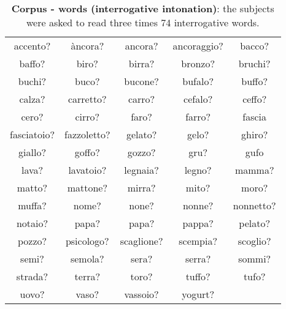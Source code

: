 \begin{table}[htbp]
  \begin{center}
  \begin{scriptsize}
	\begin{tabular}{ccccc}
	  \hline
	  accento?  & \`ancora?  & ancora?  & ancoraggio?  & bacco?\\
	  baffo?  & biro?  & birra?  & bronzo?  & bruchi?\\
	  buchi?  & buco?  & bucone?  & bufalo?  & buffo?\\ 
	  calza?  & carretto?  & carro?  & cefalo?  & ceffo?\\
	  cero?  & cirro?  & faro?  & farro?  & fascia\\
	  fasciatoio?  & fazzoletto?  & gelato?  & gelo?  & ghiro?\\
	  giallo?  & goffo?  & gozzo?  & gru?  & gufo\\
	  lava?  & lavatoio?  & legnaia?  & legno?  & mamma?\\
	  matto?  & mattone?  & mirra?  & mito?  & moro?\\
	  muffa?  & nome?  & none?  & nonne?  & nonnetto?\\
	  notaio?  & papa?  & papa?  & pappa?  & pelato?\\
	  pozzo?  & psicologo?  & scaglione?  & scempia?  & scoglio?\\
	  semi?  & semola?  & sera?  & serra?  & sommi?\\
	  strada?  & terra?  & toro?  & tuffo?  & tufo?\\
	  uovo?  & vaso?  & vassoio?  & yogurt?  & \\
	  \hline
  \end{tabular}
  \end{scriptsize}
  \end{center}
	\caption[Corpus - words (interrogative intonation)]{\textbf{Corpus - words
	(interrogative intonation)}: the subjects were asked to read three times 
	74 interrogative words.}
 \label {tab:experiments:stimuli:wi}
\end{table}



